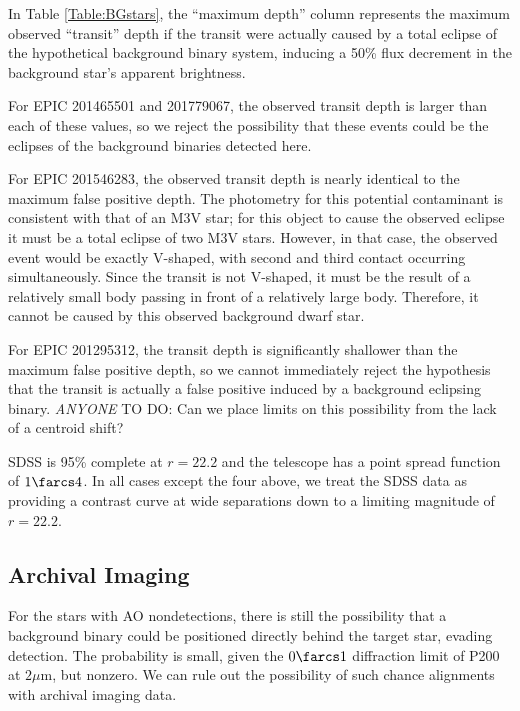 \documentclass{emulateapj}
\newcommand{\todo}[3]{{\color{#2} \emph{#1} TO DO: #3}}
\newcommand{\anytodo}[1]{\todo{ANYONE}{NavyBlue}{#1}}
\begin{document}

In Table \ref{Table:BGstars}, the ``maximum depth'' column represents
the maximum observed ``transit'' depth if the transit were actually caused
by a total eclipse of the hypothetical background binary system, inducing
a 50\% flux decrement in the background star's apparent brightness.

For EPIC 201465501 and 201779067, the observed transit depth is
larger than each of these values, so we reject the possibility that
these events could be the eclipses of the background binaries detected
here.

For EPIC 201546283, the observed transit depth is nearly identical to
the maximum false positive depth.
The photometry for this potential contaminant is consistent with that
of an M3V star; for this object to cause the observed eclipse it must
be a total eclipse of two M3V stars.
However, in that case, the observed event would be exactly V-shaped,
with second and third contact occurring simultaneously.
Since the transit is not V-shaped, it must be the result of
a relatively small body passing in front of a relatively large body.
Therefore, it cannot be caused by this observed background dwarf star.

For EPIC 201295312, the transit depth is significantly shallower than
the maximum false positive depth, so we cannot immediately
reject the hypothesis that the transit is actually a false positive
induced by a background eclipsing binary. \anytodo{Can we place limits
on this possibility from the lack of a centroid shift?}

SDSS is 95\% complete at $r=22.2$ and the telescope has a point
spread function of $1\farcs4$. In all cases except the four above, we
treat the SDSS data as providing a contrast curve at wide separations
down to a limiting magnitude of $r=22.2$.

\subsection{Archival Imaging}

For the stars with AO nondetections, there is still the
possibility that a background binary could be positioned
directly behind the target star, evading detection.
The probability is small, given the $0\farcs1$ diffraction limit
of P200 at $2\mu$m, but nonzero.
We can rule out the possibility of such chance alignments with
archival imaging data.
\end{document}
